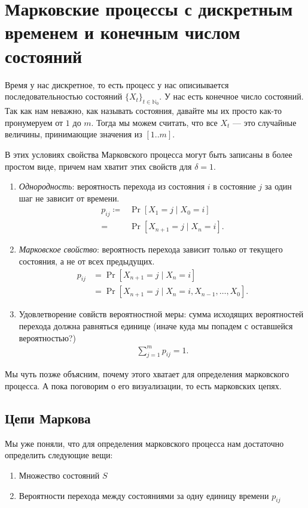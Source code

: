 \documentclass[12pt]{article}
\newcommand\N{\mathbb{N}}
\begin{document}
\section{Марковские процессы с дискретным временем и конечным числом состояний}

Время у нас дискретное, то есть процесс у нас описиывается последовательностью состояний $\{X_t\}_{t \in \N_0}$. У нас есть конечное число состояний. Так как нам неважно, как называть состояния, давайте мы их просто как-то пронумеруем от $1$ до $m$. Тогда мы можем считать, что все $X_t$ --- это случайные величины, принимающие значения из $[1..m]$.

В этих условиях свойства Марковского процесса могут быть записаны в более простом виде, причем нам хватит этих свойств для $\delta = 1$.
\begin{enumerate}
  \item \emph{Однородность}: вероятность перехода из состояния $i$ в состояние $j$ за один шаг не зависит от времени.
  \begin{align*}
    p_{ij} \coloneqq& \Pr[X_1 = j \mid X_0 = i] \\
           =& \Pr[X_{n + 1} = j \mid X_n = i].
  \end{align*}
  \item \emph{Марковское свойство}: вероятность перехода зависит только от текущего состояния, а не от всех предыдущих.
  \begin{align*}
    p_{ij} &= \Pr[X_{n + 1} = j \mid X_n = i] \\
           &= \Pr[X_{n + 1} = j \mid X_n = i, X_{n -1}, \dots, X_0].
  \end{align*}
  \item Удовлетворение совйств вероятностной меры: сумма исходящих вероятностей перехода должна равняться единице (иначе куда мы попадем с оставшейся вероятностью?)
  \begin{align*}
    \sum_{j = 1}^m p_{ij} = 1.
  \end{align*}
\end{enumerate}

Мы чуть позже объясним, почему этого хватает для определения марковского процесса. А пока поговорим о его визуализации, то есть марковских цепях.

\subsection{Цепи Маркова}

Мы уже поняли, что для определения марковского процесса нам достаточно определить следующие вещи:
\begin{enumerate}
  \item Множество состояний $S$
  \item Вероятности перехода между состояниями за одну единицу времени $p_{ij}$
\end{enumerate}
\end{document}
